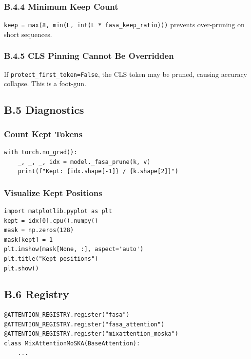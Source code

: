 \subsubsection{B.4.4 Minimum Keep Count}

\texttt{keep = max(8, min(L, int(L * fasa\_keep\_ratio)))} prevents over-pruning on 
short sequences.

\subsubsection{B.4.5 CLS Pinning Cannot Be Overridden}

If \texttt{protect\_first\_token=False}, the CLS token may be pruned, causing 
accuracy collapse. This is a foot-gun.

\subsection{B.5 Diagnostics}

\subsubsection{Count Kept Tokens}

\begin{lstlisting}
with torch.no_grad():
    _, _, _, idx = model._fasa_prune(k, v)
    print(f"Kept: {idx.shape[-1]} / {k.shape[2]}")
\end{lstlisting}

\subsubsection{Visualize Kept Positions}

\begin{lstlisting}
import matplotlib.pyplot as plt
kept = idx[0].cpu().numpy()
mask = np.zeros(128)
mask[kept] = 1
plt.imshow(mask[None, :], aspect='auto')
plt.title("Kept positions")
plt.show()
\end{lstlisting}

\subsection{B.6 Registry}

\begin{lstlisting}
@ATTENTION_REGISTRY.register("fasa")
@ATTENTION_REGISTRY.register("fasa_attention")
@ATTENTION_REGISTRY.register("mixattention_moska")
class MixAttentionMoSKA(BaseAttention):
    ...
\end{lstlisting}


